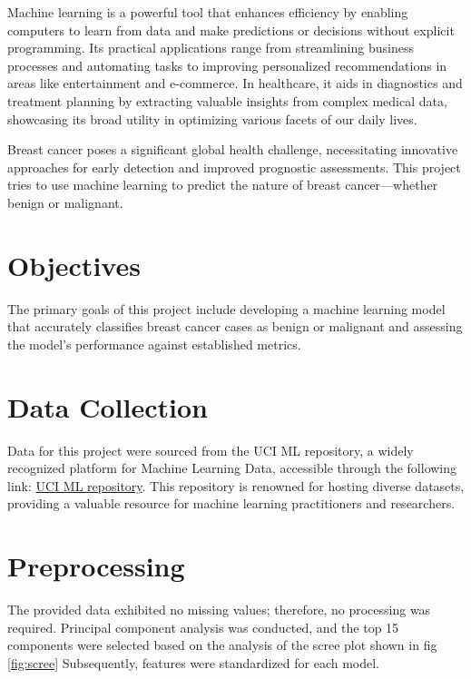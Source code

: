 \documentclass{article}
\begin{document}
Machine learning is a powerful tool that enhances efficiency by enabling computers to learn from data and make predictions or decisions without explicit programming. Its practical applications range from streamlining business processes and automating tasks to improving personalized recommendations in areas like entertainment and e-commerce. In healthcare, it aids in diagnostics and treatment planning by extracting valuable insights from complex medical data, showcasing its broad utility in optimizing various facets of our daily lives.

Breast cancer poses a significant global health challenge, necessitating innovative approaches for early detection and improved prognostic assessments. This project tries to use machine learning to predict the nature of breast cancer—whether benign or malignant.

\section{Objectives}

The primary goals of this project include developing a machine learning model that accurately classifies breast cancer cases as benign or malignant and assessing the model's performance against established metrics.

\section{Data Collection}

Data for this project were sourced from the UCI ML repository, a widely recognized platform for Machine Learning Data, accessible through the following link: \href{http://archive.ics.uci.edu/dataset/17/breast+cancer+wisconsin+diagnostic}{UCI ML repository}. This repository is renowned for hosting diverse datasets, providing a valuable resource for machine learning practitioners and researchers.

\section{Preprocessing}

The provided data exhibited no missing values; therefore, no processing was required. Principal component analysis was conducted, and the top 15 components were selected based on the analysis of the scree plot shown in fig \ref{fig:scree} Subsequently, features were standardized for each model.
\end{document}
